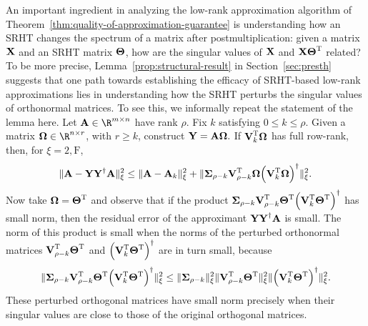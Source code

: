 
An important ingredient in analyzing the low-rank approximation algorithm of Theorem~\ref{thm:quality-of-approximation-guarantee}
is understanding how an SRHT changes the spectrum of a matrix after postmultiplication: given a matrix ${\bm{\mathrm{X}}}$ and
an SRHT matrix ${\bm{\mathrm{\Theta}}}$, how are the singular values of ${\bm{\mathrm{X}}}$ and ${\bm{\mathrm{X}}}{\bm{\mathrm{\Theta}}}^{\textsc{T}}$ related? To be more precise,
Lemma~\ref{prop:structural-result} in Section~\ref{sec:presth} suggests that one path towards establishing the efficacy of SRHT-based low-rank approximations lies in understanding how the SRHT perturbs the singular values of orthonormal matrices. To see this, we informally repeat the statement of the lemma here. Let $\matA \in \R^{m \times n}$ have rank $\rho.$ Fix $k$ satisfying $0 \leq k \leq \rho$.
Given a matrix $\matOmega \in \R^{n \times r}$, with $r \ge k$, construct ${\bm{\mathrm{Y}}} = {\bm{\mathrm{A}}} {\bm{\mathrm{\Omega}}}.$ If ${\bm{\mathrm{V}}}_k ^{\textsc{T}} {\bm{\mathrm{\Omega}}}$ has full row-rank, then,
for $\xi=2, \mathrm{F}$,
\begin{equation}
\mbox{}\|{\bm{\mathrm{A}}} - {\bm{\mathrm{Y}}} {{\bm{\mathrm{Y}}}}^\dagger {\ensuremath{\bm{\mathrm{A}}}}\|_{\xi}^2
\leq
\mbox{}\| {\bm{\mathrm{A}}} - {\bm{\mathrm{A}}}_k \|_{\xi}^2 + \mbox{}\|{\bm{\mathrm{\Sigma}}}_{\rho - k} {\bm{\mathrm{V}}}_{\rho-k} ^{\textsc{T}} {\bm{\mathrm{\Omega}}} {\left( {\bm{\mathrm{V}}}_k ^{\textsc{T}} {\bm{\mathrm{\Omega}}} \right)}^\dagger \|_{\xi}^2.
\end{equation}
Now take ${\bm{\mathrm{\Omega}}} = {\bm{\mathrm{\Theta}}}^{\textsc{T}}$
and observe that if the product ${\bm{\mathrm{\Sigma}}}_{\rho - k}{\bm{\mathrm{V}}}_{\rho-k}^{\textsc{T}} {\bm{\mathrm{\Theta}}}^{\textsc{T}} {\left( {\bm{\mathrm{V}}}_k^{\textsc{T}} {\bm{\mathrm{\Theta}}}^{\textsc{T}}\right)}^\dagger$ has small norm, then the residual error of the approximant ${\bm{\mathrm{Y}}}{{\bm{\mathrm{Y}}}}^\dagger{\ensuremath{\bm{\mathrm{A}}}}$ is small. The norm of this product is small when the norms of the perturbed orthonormal matrices ${\bm{\mathrm{V}}}_{\rho-k}^{\textsc{T}}{\bm{\mathrm{\Theta}}}^{\textsc{T}}$ and ${\left({\bm{\mathrm{V}}}_k^{\textsc{T}} {\bm{\mathrm{\Theta}}}^{\textsc{T}}\right)}^\dagger$ are in turn small, because
%
\begin{equation}
\label{eqn:basicestimate}
\XNormS{\matSig_{\rho - k} \matV_{\rho-k} \transp \matTh\transp \pinv{\left( \matV_k \transp \matTh\transp \right)}} \leq \XNormS{\matSig_{\rho - k}} \XNormS{\matV_{\rho-k} \transp \matTh\transp} \XNormS{\pinv{\left( \matV_k \transp \matTh\transp \right)}}.
\end{equation}
%
These perturbed orthogonal matrices have small norm precisely when their singular values are close to those of the original orthogonal matrices.


